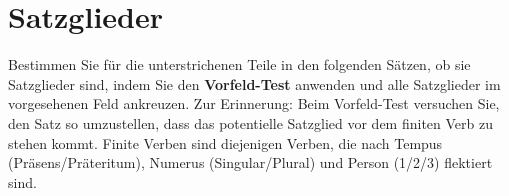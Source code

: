\section{Satzglieder}\label{sec:satzglieder}

Bestimmen Sie für die unterstrichenen Teile in den folgenden Sätzen, ob sie Satzglieder sind, indem Sie den \textbf{Vorfeld-Test} anwenden und alle Satzglieder im vorgesehenen Feld ankreuzen.
Zur Erinnerung: Beim Vorfeld-Test versuchen Sie, den Satz so umzustellen, dass das potentielle Satzglied vor dem finiten Verb zu stehen kommt.
Finite Verben sind diejenigen Verben, die nach Tempus (Präsens\slash Präteritum), Numerus (Singular\slash Plural) und Person (1\slash 2\slash 3) flektiert sind.

\Halbzeile


